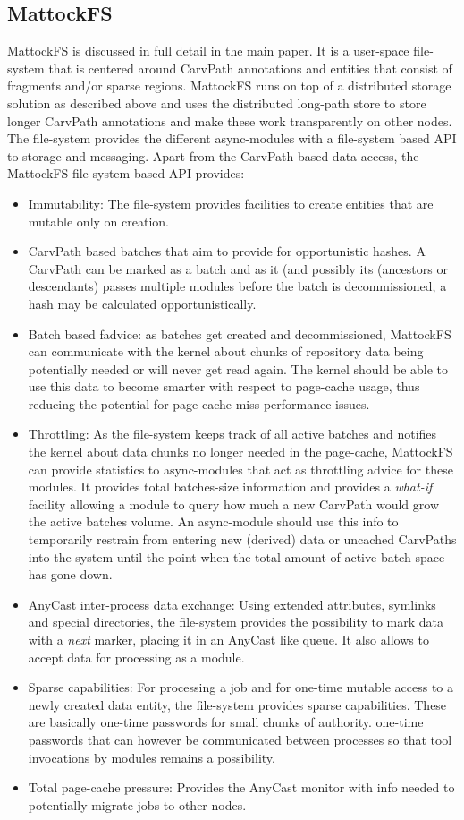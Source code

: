 \subsection{MattockFS}
MattockFS is discussed in full detail in the main paper. It is a user-space file-system that is centered around CarvPath annotations and entities that consist of fragments and/or sparse regions. MattockFS runs on top of a distributed storage solution as described above and uses the distributed long-path store to store longer CarvPath annotations and make these work transparently on other nodes. The file-system provides the different async-modules with a file-system based API to storage and messaging. Apart from the CarvPath based data access, the MattockFS file-system based API provides:
\begin{itemize}
\item Immutability: The file-system provides facilities to create entities that are mutable only on creation.
\item CarvPath based batches that aim to provide for opportunistic hashes. A CarvPath can be marked as a batch and as it (and possibly its (ancestors or descendants) passes multiple modules before the batch is decommissioned, a hash may be calculated opportunistically.
\item Batch based fadvice: as batches get created and decommissioned, MattockFS can communicate with the kernel about chunks of repository data being potentially needed or will never get read again. The kernel should be able to use this data to become smarter with respect to page-cache usage, thus reducing the potential for page-cache miss performance issues.
\item Throttling: As the file-system keeps track of all active batches and notifies the kernel about data chunks no longer needed in the page-cache, MattockFS can provide statistics to async-modules that act as throttling advice for these modules. It provides total batches-size information and provides a \emph{what-if} facility allowing a module to query how much a new CarvPath would grow the active batches volume. An async-module should use this info to temporarily restrain from entering new (derived) data or uncached CarvPaths into the system until the point when the total amount of active batch space has gone down. 
\item AnyCast inter-process data exchange: Using extended attributes, symlinks and special directories, the file-system provides the possibility to mark data with a \emph{next} marker, placing it in an AnyCast like queue. It also allows to accept data for processing as a module.
\item Sparse capabilities: For processing a job and for one-time mutable access to a newly created data entity, the file-system provides sparse capabilities. These are basically one-time passwords for small chunks of authority. one-time passwords that can however be communicated between processes so that tool invocations by modules remains a possibility.
\item Total page-cache pressure: Provides the AnyCast monitor with info needed to potentially migrate jobs to other nodes.
\end{itemize}
